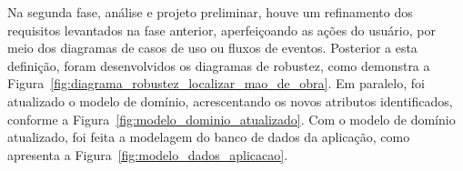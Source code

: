 %	

%	

%	

%	

%	


\par Na segunda fase, análise e projeto preliminar, houve um refinamento dos requisitos levantados na fase anterior, aperfeiçoando as ações do usuário, por meio dos diagramas de casos de uso ou fluxos de eventos. Posterior a esta definição, foram desenvolvidos os diagramas de robustez, como demonstra a Figura~\ref{fig:diagrama_robustez_localizar_mao_de_obra}. Em paralelo, foi atualizado o modelo de domínio, acrescentando os novos atributos identificados, conforme a Figura~\ref{fig:modelo_dominio_atualizado}. Com o modelo de domínio atualizado, foi feita a modelagem do banco de dados da aplicação, como apresenta a Figura~\ref{fig:modelo_dados_aplicacao}.

